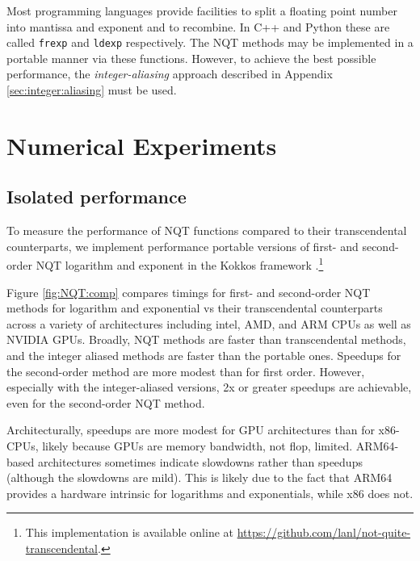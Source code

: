 \documentclass[linenumbers,twocolumn]{aastex631}
\newcommand{\mynote}[3]{
  \textcolor{#2}{\fbox{\bfseries\sffamily\scriptsize#1}}
    {\small$\blacktriangleright$\textsf{\emph{#3}}$\blacktriangleleft$}
}
\newcommand{\jf}[1]{\mynote{JF}{green}{#1}}
\newcommand{\jmm}[1]{\mynote{JMM}{blue}{#1}}
\begin{document}
Most programming languages provide facilities to split a floating point number into mantissa and exponent and to recombine. In C++ and Python these are called {\tt frexp} and {\tt ldexp} respectively. The NQT methods may be implemented in a portable manner via these functions. However, to achieve the best possible performance, the \textit{integer-aliasing} approach described in Appendix \ref{sec:integer:aliasing} must be used.

\section{Numerical Experiments}
\label{sec:numexperiments}

\subsection{Isolated performance}
\label{sec:experiment:performance}

To measure the performance of NQT functions compared to their transcendental counterparts, we implement performance portable versions of first- and second-order NQT logarithm and exponent in the Kokkos framework \citep{Kokkos}.\footnote{This implementation is available online at \url{https://github.com/lanl/not-quite-transcendental}.}

Figure \ref{fig:NQT:comp} compares timings for first- and second-order NQT methods for logarithm and exponential vs their transcendental counterparts across a variety of architectures including intel, AMD, and ARM CPUs as well as NVIDIA GPUs. Broadly, NQT methods are faster than transcendental methods, and the integer aliased methods are faster than the portable ones. Speedups for the second-order method are more modest than for first order. However, especially with the integer-aliased versions, 2x or greater speedups are achievable, even for the second-order NQT method.

Architecturally, speedups are more modest for GPU architectures than for x86-CPUs, likely because GPUs are memory bandwidth, not flop, limited. ARM64-based architectures sometimes indicate slowdowns rather than speedups (although the slowdowns are mild). This is likely due to the fact that ARM64 provides a hardware intrinsic for logarithms and exponentials, while x86 does not.
\end{document}
